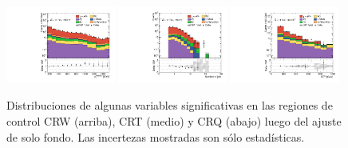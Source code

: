 \begin{figure}[ht!]
\begin{center}
    \includegraphics[width=0.32\textwidth]{images/results/fr2_unblind/can_CRQ_ph_pt0_afterFit.pdf}
    \includegraphics[width=0.32\textwidth]{images/results/fr2_unblind/can_CRQ_jet_n_afterFit.pdf}
    \includegraphics[width=0.32\textwidth]{images/results/fr2_unblind/can_CRQ_met_et_afterFit.pdf}

    \caption{Distribuciones de algunas variables significativas en las regiones de control CRW (arriba), CRT (medio) y CRQ (abajo) luego del ajuste de solo fondo. Las incertezas mostradas son sólo estadísticas.}
    \label{fig:cr_dist}
  \end{center}
\end{figure}



